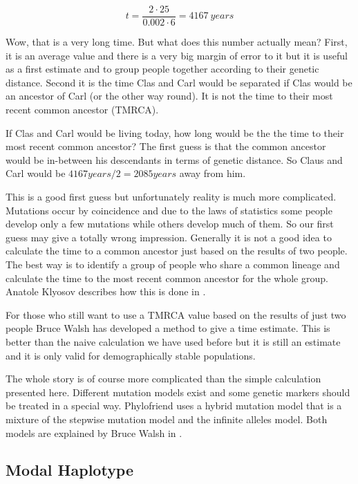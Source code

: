 \begin{equation}
t = \frac{2 \cdot 25}{0.002 \cdot 6} = 4167\ years
\end{equation}

Wow, that is a very long time. But what does this number
actually mean? First, it is an average value and there is
a very big margin of error to it but it is useful as a first
estimate and to group people together according to their
genetic distance. Second it is the time Clas and Carl would
be separated if Clas would be an ancestor of Carl (or the
other way round). It is not the time to their most recent
common ancestor (TMRCA).

If Clas and Carl would be living today, how long would be the
the time to their most recent common ancestor? The first guess
is that the common ancestor would be in-between his descendants
in terms of genetic distance. So Claus and Carl would be
$4167years / 2 = 2085years$ away from him. 

This is a good first guess but unfortunately reality is much
more complicated. Mutations occur by coincidence and due to
the laws of statistics some people develop only a few mutations
while others develop much of them. So our first guess may give
a totally wrong impression. Generally it is not a good idea to
calculate the time to a common ancestor just based on the results
of two people. The best way is to identify a group of people who
share a common lineage and calculate the time to the most recent
common ancestor for the whole group. Anatole Klyosov describes
how this is done in \cite{Kly09}.

For those who still want to use a TMRCA value based on the results
of just two people Bruce Walsh has developed a method to give
a time estimate\cite{Wal01}. This is better than the naive
calculation we have used before but it is still an estimate and
it is only valid for demographically stable populations.

The whole story is of course more complicated than the simple
calculation presented here. Different mutation models exist
and some genetic markers should be treated in a special way.
Phylofriend uses a hybrid mutation model that is a mixture
of the stepwise mutation model and the infinite alleles model.
Both models are explained by Bruce Walsh in \cite{Wal02}.


\subsection{Modal Haplotype}

